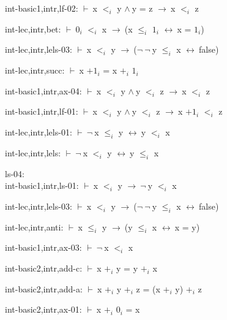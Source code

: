 \documentclass[a4paper]{article}
\newcommand{\Fol}{\mbox{$\vdash\ $}}
\newcommand{\Not}{\mbox{$\neg\ $}}
\newcommand{\And}{\mbox{$\wedge\ $}}
\newcommand{\Imp}{\mbox{$\rightarrow\ $}}
\newcommand{\Equiv}{\mbox{$\leftrightarrow\ $}}
\begin{document}
int-basic1,intr,lf-02: 
 \Fol x $\mbox{$<$}_{i}$ y \And y = z \Imp x $\mbox{$<$}_{i}$ z



int-lec,intr,bet: 
 \Fol $\mbox{0}_{i}$ $\mbox{$<$}_{i}$ x \Imp (x $\mbox{$\le$}_{i}$ $\mbox{1}_{i}$ \Equiv x = $\mbox{1}_{i}$)



int-lec,intr,lels-03: 
 \Fol x $\mbox{$<$}_{i}$ y \Imp (\Not \Not y $\mbox{$\le$}_{i}$ x \Equiv false)



int-lec,intr,succ: 
 \Fol x $\mbox{+1}_{i}$ = x $\mbox{+}_{i}$ $\mbox{1}_{i}$



int-basic1,intr,ax-04: 
 \Fol x $\mbox{$<$}_{i}$ y \And y $\mbox{$<$}_{i}$ z \Imp x $\mbox{$<$}_{i}$ z



int-basic1,intr,lf-01: 
 \Fol x $\mbox{$<$}_{i}$ y \And y $\mbox{$<$}_{i}$ z \Imp x $\mbox{+1}_{i}$ $\mbox{$<$}_{i}$ z



int-lec,intr,lels-01: 
 \Fol \Not x $\mbox{$\le$}_{i}$ y \Equiv y $\mbox{$<$}_{i}$ x



int-lec,intr,lels: 
 \Fol \Not x $\mbox{$<$}_{i}$ y \Equiv y $\mbox{$\le$}_{i}$ x



\bigskip

ls-04:\\ int-basic1,intr,ls-01: 
 \Fol x $\mbox{$<$}_{i}$ y \Imp \Not y $\mbox{$<$}_{i}$ x



int-lec,intr,lels-03: 
 \Fol x $\mbox{$<$}_{i}$ y \Imp (\Not \Not y $\mbox{$\le$}_{i}$ x \Equiv false)



int-lec,intr,anti: 
 \Fol x $\mbox{$\le$}_{i}$ y \Imp (y $\mbox{$\le$}_{i}$ x \Equiv x = y)



int-basic1,intr,ax-03: 
 \Fol \Not x $\mbox{$<$}_{i}$ x



int-basic2,intr,add-c: 
 \Fol x $\mbox{+}_{i}$ y = y $\mbox{+}_{i}$ x



int-basic2,intr,add-a: 
 \Fol x $\mbox{+}_{i}$ y $\mbox{+}_{i}$ z = (x $\mbox{+}_{i}$ y) $\mbox{+}_{i}$ z



int-basic2,intr,ax-01: 
 \Fol x $\mbox{+}_{i}$ $\mbox{0}_{i}$ = x
\end{document}
